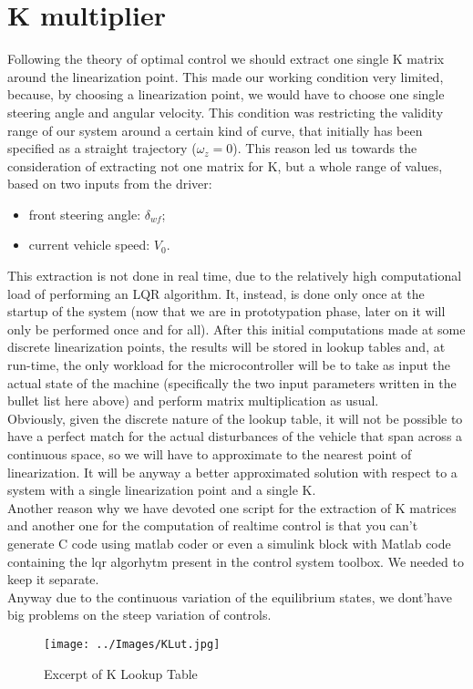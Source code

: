 \section{K multiplier}
Following the theory of optimal control we should extract one single K matrix around the linearization point. This made our working condition very limited, because, by choosing a linearization point, we would have to choose one single steering angle and angular velocity. This condition was restricting the validity range of our system around a certain kind of curve, that initially has been specified as a straight trajectory ($\omega_{z}=0$).
This reason led us towards the consideration of extracting not one matrix for K, but a whole range of values, based on two inputs from the driver:
\begin{itemize}
	\item front steering angle: $\delta_{wf}$;
	\item current vehicle speed: $V_0$.
\end{itemize}	
This extraction is not done in real time, due to the relatively high computational load of performing an LQR algorithm. It, instead, is done only once at the startup of the system (now that we are in prototypation phase, later on it will only be performed once and for all). After this initial computations made at some discrete linearization points, the results will be stored in lookup tables and, at run-time, the only workload for the microcontroller will be to take as input the actual state of the machine (specifically the two input parameters written in the bullet list here above) and perform matrix multiplication as usual.\\
Obviously, given the discrete nature of the lookup table, it will not be possible to have a perfect match for the actual disturbances of the vehicle that span across a continuous space, so we will have to approximate to the nearest point of linearization. It will be anyway a better approximated solution with respect to a system with a single linearization point and a single K.\\
Another reason why we have devoted one script for the extraction of K matrices and another one for the computation of realtime control is that you can't generate C code using matlab coder or even a simulink block with Matlab code containing the lqr algorhytm present in the control system toolbox. We needed to keep it separate.\\
Anyway due to the continuous variation of the equilibrium states, we dont'have big problems on the steep variation of controls.
\begin{figure}[!h]
\texttt{[image: ../Images/KLut.jpg]}\caption{Excerpt of K Lookup Table}
\end{figure}
